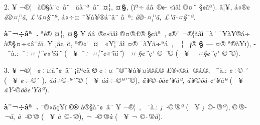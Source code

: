 \documentclass[12pt,twoside,a4paper]{article}
\newenvironment{prym}
               {\list{}{\leftmargin1.7\parindent
                        \listparindent\parindent
                        \itemindent\parindent
                        \parsep0.5ex\topsep1ex   
               }%
                        \footnotesize
                        \item\relax}
               {\endlist}
\begin{document}
2. ^^8d^^a5 ^^ac^^ae^^a6^^ad^^a0 ^^e0^^ae^^a7^^e0^^a8^^a2^^a0^^e2^^a8 ^^a0^^e4^^e0^^a8^^aa^^a0^^e2^^a8 
             \textbf{^^a4^^a6}, \textbf{^^a4^^a7}, (^^ef^^aa^^f7 ^^e1^^e2^^a0^^ad^^ae^^a2-\linebreak
^^ab^^ef^^e2^^ec ^^ae^^a4^^a8^^ad ^^a7^^a2^^e3^^aa). ^^8e^^e2^^a6^^a5, ^^e1^^ab^^ae^^a2^^a0 \emph{^^e5^^ae^^a4^^a6\'^^e3, ^^a3\'^^e3^^a4^^a7^^a8^^aa},
                              ^^e1^^ab^^f7^^a4 ^^af^^a5^^e0^^a5^^ad^^ae^^e1^^a8^^e2^^a8\linebreak 
^^e2^^a0^^aa: \emph{^^e5^^ae-^^a4^^a6\'^^e3, ^^a3\'^^e3-^^a4^^a7^^a8^^aa}. 
\begin{prym}
\textbf{^^8f^^e0^^a8^^ac^^f7^^e2^^aa^^a0.} 
^^9f^^aa^^e9^^ae \textbf{^^a4^^a6}, \textbf{^^a4^^a7} 
                   ^^ad^^a5 ^^e1^^e2^^a0^^ad^^ae^^a2^^ab^^ef^^e2^^ec ^^ae^^a4^^ad^^ae^^a3^^ae ^^a7^^a2^^e3^^aa^^a0, ^^a2^^ae^^ad^^a8\linebreak
^^ac^^ae^^a6^^e3^^e2^^ec ^^af^^e0^^a8 ^^af^^a5^^e0^^a5^^ad^^ae^^e1^^f7 ^^e0^^ae^^a7^^a4^^f7^^ab^^e2^^a8^^e1^^ef. ^^96^^a5 ^^a1^^e3^^a2^^a0^^f5, ^^aa^^ae^^ab^^a8 
                                \textbf{^^a4} ^^ad^^a0^^ab^^a5^^a6^^a8^^e2^^ec \linebreak 
^^a4^^ae ^^af^^e0^^a5^^e4^^f7^^aa^^e1^^a0, ^^a0 \textbf{^^a6} ^^a0^^a1^^ae
\textbf{^^a7} --- ^^a4^^ae ^^aa^^ae^^e0^^a5^^ad^^ef), ^^ad^^a0^^af^^e0.: \emph{^^af^^f7^^a4-^^a6^^a8^^a2^^ab\'^^ef^^e2^^a8}
                                               (^^a0 ^^ad^^a5\linebreak 
\emph{^^af^^f7-^^a4^^a6^^a8^^a2^^ab\'^^ef^^e2^^a8}) \emph{^^ad^^a0^^a4-^^a7^^a2^^a8^^e7\'^^a0^^a9-^^ad^^a8^^a9} 
(^^a0 ^^ad^^a5 \emph{^^ad^^a0-^^a4^^a7^^a2^^a8^^e7\'^^a0^^a9^^ad^^a8^^a9}).
\end{prym}
\eject

3. ^^8d^^a5 ^^ac^^ae^^a6^^ad^^a0 ^^a2^^f7^^a4^^e0^^a8^^a2^^a0^^e2^^a8 ^^a1^^e3^^aa^^a2^^e3 \textbf{^^a9} 
                             ^^a2^^f7^^a4 ^^af^^ae^^af^^a5^^e0^^a5^^a4^^ad^^ec^^ae^^a3^^ae ^^a3^^ae^^ab^^ae^^e1-\linebreak
^^ad^^ae^^a3^^ae, ^^ad^^a0^^af^^e0.: \emph{^^a2^^f7^^a9-^^ad\'^^a0} (^^a0 ^^ad^^a5 \emph{^^a2^^f7-^^a9^^ad\'^^a0}),
        \emph{^^e1^^e2^^f7^^a9-^^aa\'^^a8^^a9} (^^a0 ^^ad^^a5 \emph{^^e1^^e2^^f7-^^a9^^aa\'^^a8^^a9}), \linebreak
\emph{^^e4^^a5^^a9-^^f5^^e0^^a2\'^^a5^^e0^^aa}, \emph{^^e4^^a5^^a9^^f5^^e0-^^a2\'^^a5^^e0^^aa} 
                         (^^a0 ^^ad^^a5 \emph{^^e4^^a5-^^a9^^f5^^e0^^a2\'^^a5^^e0^^aa}).
\begin{prym}
\textbf{^^8f^^e0^^a8^^ac^^f7^^e2^^aa^^a0.} 
  ^^91^^af^^ae^^ab^^e3^^e7^^a5^^ad^^ad^^ef \textbf{^^a9^^ae} ^^e0^^ae^^a7^^e0^^a8^^a2^^a0^^e2^^a8 ^^ad^^a5 ^^ac^^ae^^a6^^ad^^a0, ^^ad^^a0^^af^^e0.: \linebreak
\emph{^^a1^^a0-^^a9\'^^ae^^aa} (^^a0 ^^ad^^a5 \emph{^^a1^^a0^^a9-\'^^ae^^aa}), \emph{^^a9\'^^ae-^^ac^^e3}, 
\emph{^^e0^^a0-^^a9\'^^ae^^ad} (^^a0 ^^ad^^a5 \emph{^^e0^^a0^^a9-\'^^ae^^ad}), \emph{^^ac^^a0-^^a9\'^^ae^^e0} 
                                               (^^a0 ^^ad^^a5 \linebreak
\emph{^^ac^^a0^^a9-\'^^ae^^e0}).
\end{prym}
\end{document}
